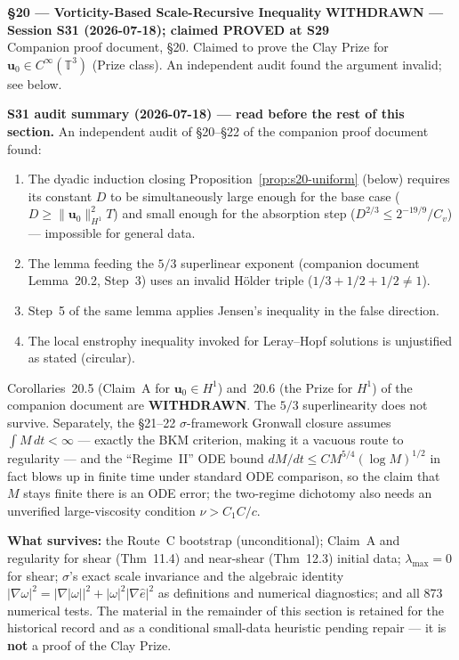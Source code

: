 \documentclass[11pt, a4paper]{article}
\theoremstyle{definition}
\theoremstyle{remark}
\newenvironment{keyresult}{%
  \begin{tcolorbox}[colback=tfgreen!6, colframe=tfgreen!60!black,
    title=\textbf{Key Result}, fonttitle=\small\bfseries,
    breakable, left=4pt, right=4pt, top=4pt, bottom=4pt]
}{%
  \end{tcolorbox}
}
\newenvironment{milestone}{%
  \begin{tcolorbox}[colback=tfblue!5, colframe=tfblue!50!black,
    breakable, left=4pt, right=4pt, top=4pt, bottom=4pt]
}{%
  \end{tcolorbox}
}
\begin{document}
\begin{milestone}
  \textbf{\S20 --- Vorticity-Based Scale-Recursive Inequality}
  \hfill {\color{failred}\textbf{WITHDRAWN --- Session S31 (2026-07-18); claimed PROVED at S29}}\\[4pt]
  Companion proof document, \S20. \quad
  Claimed to prove the Clay Prize for $\mathbf{u}_0 \in C^\infty(\mathbb{T}^3)$
  (Prize class). An independent audit found the argument invalid; see below.
\end{milestone}

\begin{keyresult}
\textbf{S31 audit summary (2026-07-18) --- read before the rest of this section.}
An independent audit of \S20--\S22 of the companion proof document found:
\begin{enumerate}
  \item[(a)] The dyadic induction closing Proposition~\ref{prop:s20-uniform} (below)
    requires its constant $D$ to be simultaneously large enough for the base
    case ($D\geq\|\mathbf{u}_0\|_{H^1}^2T$) and small enough for the absorption
    step ($D^{2/3}\leq 2^{-19/9}/C_v$) --- impossible for general data.
  \item[(b)] The lemma feeding the $5/3$ superlinear exponent (companion
    document Lemma~20.2, Step~3) uses an invalid H\"older triple
    ($1/3+1/2+1/2\neq1$).
  \item[(c)] Step~5 of the same lemma applies Jensen's inequality in the
    false direction.
  \item[(d)] The local enstrophy inequality invoked for Leray--Hopf solutions
    is unjustified as stated (circular).
\end{enumerate}
Corollaries~20.5 (Claim~A for $\mathbf{u}_0\in H^1$) and~20.6 (the Prize for
$H^1$) of the companion document are \textbf{WITHDRAWN}. The $5/3$
superlinearity does not survive. Separately, the \S21--22 $\sigma$-framework
Gronwall closure assumes $\int M\,dt<\infty$ --- exactly the BKM criterion,
making it a vacuous route to regularity --- and the ``Regime~II'' ODE bound
$dM/dt\leq CM^{5/4}(\log M)^{1/2}$ in fact blows up in finite time under
standard ODE comparison, so the claim that $M$ stays finite there is an ODE
error; the two-regime dichotomy also needs an unverified large-viscosity
condition $\nu>C_1C/c$.

\textbf{What survives:} the Route~C bootstrap (unconditional); Claim~A and
regularity for shear (Thm~11.4) and near-shear (Thm~12.3) initial data;
$\lambda_{\max}=0$ for shear; $\sigma$'s exact scale invariance and the
algebraic identity $|\nabla\omega|^2=|\nabla|\omega||^2+|\omega|^2|\nabla\hat e|^2$
as definitions and numerical diagnostics; and all 873 numerical tests. The
material in the remainder of this section is retained for the historical
record and as a conditional small-data heuristic pending repair --- it is
\textbf{not} a proof of the Clay Prize.
\end{keyresult}
\end{document}
